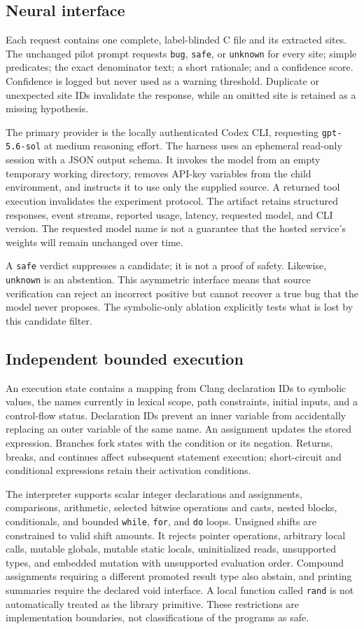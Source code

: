 \documentclass[sigconf]{acmart}
\begin{document}
\subsection{Neural interface}
Each request contains one complete, label-blinded C file and its extracted
sites. The unchanged pilot prompt requests \texttt{bug}, \texttt{safe}, or
\texttt{unknown} for every site; simple predicates; the exact denominator text;
a short rationale; and a confidence score. Confidence is logged but never
used as a warning threshold. Duplicate or unexpected site IDs invalidate the
response, while an omitted site is retained as a missing hypothesis.

The primary provider is the locally authenticated Codex CLI, requesting
\texttt{gpt-5.6-sol} at medium reasoning effort. The harness uses an ephemeral
read-only session with a JSON output schema. It invokes the model from an empty
temporary working directory, removes API-key variables from the child
environment, and instructs it to use only the supplied source. A returned tool
execution invalidates the experiment protocol. The artifact retains structured
responses, event streams, reported usage, latency, requested model, and CLI
version. The requested model name is not a guarantee that the hosted service's
weights will remain unchanged over time.

A \texttt{safe} verdict suppresses a candidate; it is not a proof of safety.
Likewise, \texttt{unknown} is an abstention. This asymmetric interface means that
source verification can reject an incorrect positive but cannot recover a true
bug that the model never proposes. The symbolic-only ablation explicitly tests
what is lost by this candidate filter.

\subsection{Independent bounded execution}
An execution state contains a mapping from Clang declaration IDs to symbolic
values, the names currently in lexical scope, path constraints, initial inputs,
and a control-flow status. Declaration IDs prevent an inner variable from
accidentally replacing an outer variable of the same name. An assignment
updates the stored expression. Branches fork states with the condition or its
negation. Returns, breaks, and continues affect subsequent statement execution;
short-circuit and conditional expressions retain their activation conditions.

The interpreter supports scalar integer declarations and assignments,
comparisons, arithmetic, selected bitwise operations and casts, nested blocks,
conditionals, and bounded \texttt{while}, \texttt{for}, and \texttt{do} loops.
Unsigned shifts are constrained to valid shift amounts. It rejects pointer
operations, arbitrary local calls, mutable globals, mutable static locals,
uninitialized reads, unsupported types, and embedded mutation with unsupported
evaluation order. Compound assignments requiring a different promoted result
type also abstain, and printing summaries require the declared void interface.
A local function called \texttt{rand} is not automatically
treated as the library primitive. These restrictions are implementation
boundaries, not classifications of the programs as safe.
\end{document}
